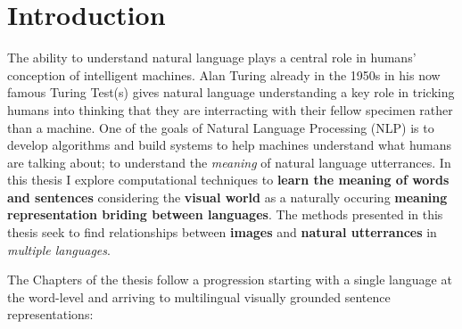 

\chapter{Introduction}
\label{ch:introduction}

The ability to understand natural language plays a central role in humans' conception of intelligent machines.
Alan Turing already in the 1950s in his now famous Turing Test(s) gives natural language understanding a 
key role in tricking humans into thinking that they are interracting with their fellow specimen rather 
than a machine. One of the goals of Natural Language Processing (NLP) is to develop algorithms
and build systems to help machines understand what humans are talking about; to 
understand the \emph{meaning} of natural language utterrances. 
In this thesis I explore computational techniques to 
\textbf{learn the meaning of words and  sentences}
considering the \textbf{visual world} as a naturally occuring 
\textbf{meaning representation briding between languages}. 
The methods presented in this thesis seek to find relationships between \textbf{images} and 
\textbf{natural utterrances} in \emph{multiple languages}. 


The  Chapters of the thesis follow a progression 
starting with a single language at the word-level and arriving to multilingual visually grounded sentence
representations:

